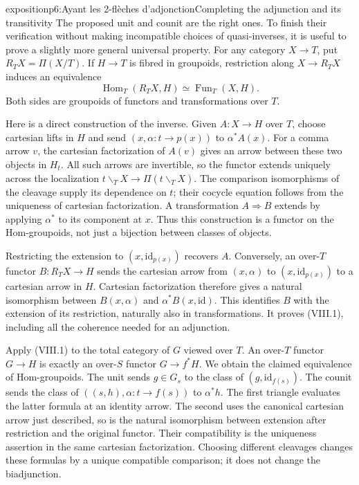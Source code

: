 \begin{dcomment}{exposition}{p6:Ayant les 2-flèches d'adjonction}{Completing the adjunction and its transitivity}
The proposed unit and counit are the right ones. To finish their verification without making incompatible choices of quasi-inverses, it is useful to prove a slightly more general universal property. For any category $X\to T$, put $R_TX=\Pi(X/T)$. If $H\to T$ is fibred in groupoids, restriction along $X\to R_TX$ induces an equivalence
\[
 \operatorname{Hom}_T(R_TX,H)\simeq\operatorname{Fun}_T(X,H).
 \tag{VIII.1}
\]
Both sides are groupoids of functors and transformations over $T$.

Here is a direct construction of the inverse. Given $A:X\to H$ over $T$, choose cartesian lifts in $H$ and send $(x,\alpha:t\to p(x))$ to $\alpha^*A(x)$. For a comma arrow $v$, the cartesian factorization of $A(v)$ gives an arrow between these two objects in $H_t$. All such arrows are invertible, so the functor extends uniquely across the localization $t\backslash_T X\to\Pi(t\backslash_T X)$. The comparison isomorphisms of the cleavage supply its dependence on $t$; their cocycle equation follows from the uniqueness of cartesian factorization. A transformation $A\Rightarrow B$ extends by applying $\alpha^*$ to its component at $x$. Thus this construction is a functor on the Hom-groupoids, not just a bijection between classes of objects.

Restricting the extension to $(x,\mathrm{id}_{p(x)})$ recovers $A$. Conversely, an over-$T$ functor $B:R_TX\to H$ sends the cartesian arrow from $(x,\alpha)$ to $(x,\mathrm{id}_{p(x)})$ to a cartesian arrow in $H$. Cartesian factorization therefore gives a natural isomorphism between $B(x,\alpha)$ and $\alpha^*B(x,\mathrm{id})$. This identifies $B$ with the extension of its restriction, naturally also in transformations. It proves (VIII.1), including all the coherence needed for an adjunction.

Apply (VIII.1) to the total category of $G$ viewed over $T$. An over-$T$ functor $G\to H$ is exactly an over-$S$ functor $G\to f^*H$. We obtain the claimed equivalence of Hom-groupoids. The unit sends $g\in G_s$ to the class of $(g,\mathrm{id}_{f(s)})$. The counit sends the class of $((s,h),\alpha:t\to f(s))$ to $\alpha^*h$. The first triangle evaluates the latter formula at an identity arrow. The second uses the canonical cartesian arrow just described, so is the natural isomorphism between extension after restriction and the original functor. Their compatibility is the uniqueness assertion in the same cartesian factorization. Choosing different cleavages changes these formulas by a unique compatible comparison; it does not change the biadjunction.


\end{dcomment}
